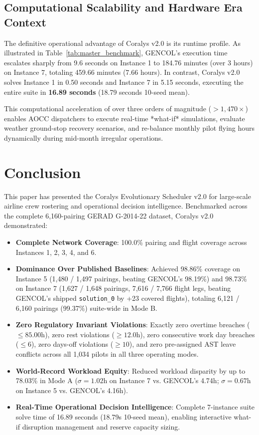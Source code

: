 \documentclass[journal]{IEEEtran}
\begin{document}
\subsection{Computational Scalability and Hardware Era Context}

The definitive operational advantage of Coralys v2.0 is its runtime profile. As illustrated in Table~\ref{tab:master_benchmark}, GENCOL's execution time escalates sharply from 9.6 seconds on Instance 1 to 184.76 minutes (over 3 hours) on Instance 7, totaling 459.66 minutes (7.66 hours). In contrast, Coralys v2.0 solves Instance 1 in 0.50 seconds and Instance 7 in 5.15 seconds, executing the entire suite in \textbf{16.89 seconds} (18.79 seconds 10-seed mean).

This computational acceleration of over three orders of magnitude ($> 1,470\times$) enables AOCC dispatchers to execute real-time *what-if* simulations, evaluate weather ground-stop recovery scenarios, and re-balance monthly pilot flying hours dynamically during mid-month irregular operations.

\section{Conclusion}

This paper has presented the Coralys Evolutionary Scheduler v2.0 for large-scale airline crew rostering and operational decision intelligence. Benchmarked across the complete 6,160-pairing GERAD G-2014-22 dataset, Coralys v2.0 demonstrated:
\begin{itemize}
    \item \textbf{Complete Network Coverage}: 100.0\% pairing and flight coverage across Instances 1, 2, 3, 4, and 6.
    \item \textbf{Dominance Over Published Baselines}: Achieved 98.86\% coverage on Instance 5 (1,480 / 1,497 pairings, beating GENCOL's 98.19\%) and 98.73\% on Instance 7 (1,627 / 1,648 pairings, 7,616 / 7,766 flight legs, beating GENCOL's shipped \texttt{solution\_0} by +23 covered flights), totaling 6,121 / 6,160 pairings (99.37\%) suite-wide in Mode B.
    \item \textbf{Zero Regulatory Invariant Violations}: Exactly zero overtime breaches ($\le 85.00$h), zero rest violations ($\ge 12.0$h), zero consecutive work day breaches ($\le 6$), zero days-off violations ($\ge 10$), and zero pre-assigned AST leave conflicts across all 1,034 pilots in all three operating modes.
    \item \textbf{World-Record Workload Equity}: Reduced workload disparity by up to 78.03\% in Mode A ($\sigma = 1.02$h on Instance 7 vs. GENCOL's 4.74h; $\sigma = 0.67$h on Instance 5 vs. GENCOL's 4.16h).
    \item \textbf{Real-Time Operational Decision Intelligence}: Complete 7-instance suite solve time of 16.89 seconds (18.79s 10-seed mean), enabling interactive what-if disruption management and reserve capacity sizing.
\end{itemize}
\end{document}
